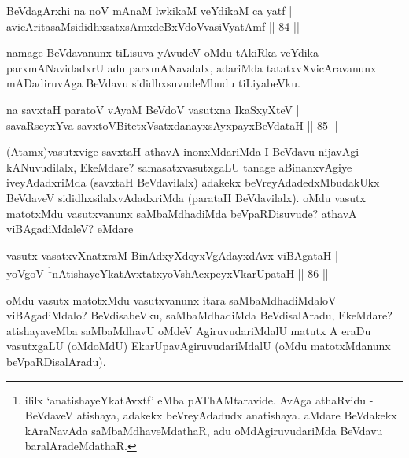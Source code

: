 
\begin{shl}
BeVdagArxhi na noV mAnaM lwkikaM veYdikaM ca yatf  | \\
avicAritasaMsididhxsatxsAmxdeBxVdoV\s vasiVyatAmf \hfill||  84 ||  
\end{shl}

\begin{artha}
namage BeVdavanunx tiLisuva yAvudeV oMdu tAkiRka veYdika parxmANavidadxrU adu parxmANavalalx, adariMda tatatxvXvicAravanunx mADadiruvAga BeVdavu sididhxsuvudeMbudu tiLiyabeVku.
\end{artha}

\begin{shl}
na savxtaH paratoV vA\s yaM BeVdoV vasutxna IkaSxyXteV  | \\
savaRseyxYva savxtoV\s BitetxVsatxdanayxsAyxpayxBeVdataH \hfill||  85 ||  
\end{shl}

\begin{artha}
(Atamx)vasutxvige savxtaH athavA inonxMdariMda I BeVdavu nijavAgi kANuvudilalx, EkeMdare? samasatxvasutxgaLU tanage aBinanxvAgiye iveyAdadxriMda (savxtaH BeVdavilalx) adakekx beVreyAdadedxMbudakUkx BeVdaveV sididhxsilalxvAdadxriMda (parataH BeVdavilalx). oMdu vasutx matotxMdu vasutxvanunx saMbaMdhadiMda beVpaRDisuvude? athavA viBAgadiMdaleV? eMdare 
\end{artha}


\begin{shl}
vasutx vasatxvXnatxraM BinAdxyXdoyxVgAdayxdAvx viBAgataH  | \\
yoVgoV \footnote{ililx `anatishayeYkatAvxtf' eMba pAThAMtaravide. AvAga athaRvidu - BeVdaveV atishaya, adakekx beVreyAdadudx anatishaya. aMdare BeVdakekx kAraNavAda saMbaMdhaveMdathaR, adu oMdAgiruvudariMda BeVdavu baralAradeMdathaR.}nAtishayeYkatAvxtatxyoVshAcxpeyxVkarUpataH \hfill||  86 ||  
\end{shl}

\begin{artha}
oMdu vasutx matotxMdu vasutxvanunx itara saMbaMdhadiMdaloV viBAgadiMdalo? BeVdisabeVku, saMbaMdhadiMda BeVdisalAradu, EkeMdare? atishayaveMba saMbaMdhavU oMdeV AgiruvudariMdalU matutx A eraDu vasutxgaLU (oMdoMdU) EkarUpavAgiruvudariMdalU (oMdu matotxMdanunx beVpaRDisalAradu).
\end{artha}


